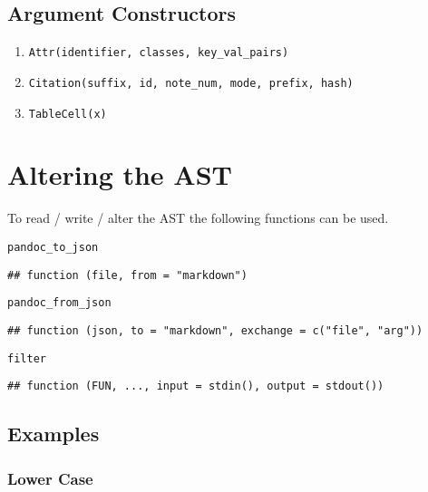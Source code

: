 \documentclass[a4paper]{article}\usepackage[]{graphicx}\usepackage[]{color}
\makeatletter
\newcommand{\hlstd}[1]{\textcolor[rgb]{0,0,0}{#1}}%
\newenvironment{kframe}{%
 \def\at@end@of@kframe{}%
 \ifinner\ifhmode%
  \def\at@end@of@kframe{\end{minipage}}%
  \begin{minipage}{\columnwidth}%
 \fi\fi%
 \def\FrameCommand##1{\hskip\@totalleftmargin \hskip-\fboxsep
 \colorbox{shadecolor}{##1}\hskip-\fboxsep
     \hskip-\linewidth \hskip-\@totalleftmargin \hskip\columnwidth}%
 \MakeFramed {\advance\hsize-\width
   \@totalleftmargin\z@ \linewidth\hsize
   \@setminipage}}%
 {\par\unskip\endMakeFramed%
 \at@end@of@kframe}
\newenvironment{knitrout}{}{} %
\newcommand{\code}[1]{\texttt{#1}}
\makeatother
\begin{document}
\subsection{Argument Constructors}
\begin{enumerate}
    \item \code{Attr(identifier, classes, key\_val\_pairs)}
    \item \code{Citation(suffix, id, note\_num, mode, prefix, hash)}
    \item \code{TableCell(x)}
\end{enumerate}
 
\newpage

\section{Altering the AST}
To read / write / alter the AST the following functions can be used.



\begin{knitrout}
\color{fgcolor}\begin{kframe}
\begin{alltt}
\hlstd{pandoc_to_json}
\end{alltt}
\begin{verbatim}
## function (file, from = "markdown")
\end{verbatim}
\begin{alltt}
\hlstd{pandoc_from_json}
\end{alltt}
\begin{verbatim}
## function (json, to = "markdown", exchange = c("file", "arg"))
\end{verbatim}
\begin{alltt}
\hlstd{filter}
\end{alltt}
\begin{verbatim}
## function (FUN, ..., input = stdin(), output = stdout())
\end{verbatim}
\end{kframe}
\end{knitrout}

\subsection{Examples}
\subsubsection{Lower Case}
\end{document}
